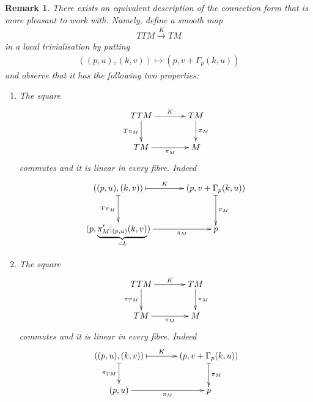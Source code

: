 \documentclass[11pt,a4paper,twoside,openany]{report}
\theoremstyle{my-theorem}
\theoremstyle{non-theorem}
\newtheorem{remark}[theorem]{Remark}
\begin{document}
			\begin{remark}
				There exists an equivalent description of the connection form that is more pleasant to work with. Namely, define a smooth map
				\begin{align*}
					TTM \xrightarrow{K} TM
				\end{align*}
				in a local trivialisation by putting
				\begin{align*}
					((p,u),(k,v)) \mapsto (p,v+\Gamma_p(k,u))
				\end{align*}
				and observe that it has the following two properties:
				\begin{enumerate}[label=\rm(\alph*)]
					\item The square
					\begin{align*}
						\xymatrixcolsep{3pc}\xymatrix{
							TTM \ar[d]_-{T\pi_{M}} \ar[r]^-{K} &
							TM \ar[d]^-{\pi_M}\\
							TM \ar[r]_-{\pi_M} & M}
					\end{align*}
					commutes and it is linear in every fibre. Indeed
					\begin{align*}
						\xymatrixcolsep{3pc}\xymatrix{
							((p,u),(k,v)) \ar@{|->}[d]_-{T\pi_{M}} \ar@{|->}[r]^-{K} &
							(p,v+\Gamma_p(k,u)) \ar@{|->}[d]^-{\pi_M}\\
							(p,\underbrace{\pi_M'|_{(p,u)}(k,v)}_{=k}) \ar[r]_-{\pi_M} & p}
					\end{align*}
				
					\item The square
					\begin{align*}
						\xymatrixcolsep{3pc}\xymatrix{
							TTM \ar[d]_-{\pi_{TM}} \ar[r]^-{K} &
							TM \ar[d]^-{\pi_M}\\
							TM \ar[r]_-{\pi_M} & M}
					\end{align*}
					commutes and it is linear in every fibre. Indeed
					\begin{align*}
						\xymatrixcolsep{3pc}\xymatrix{
							((p,u),(k,v)) \ar@{|->}[d]_-{\pi_{TM}} \ar@{|->}[r]^-{K} &
							(p,v+\Gamma_p(k,u)) \ar@{|->}[d]^-{\pi_M}\\
							(p,u) \ar[r]_-{\pi_M} & p}
					\end{align*}
				\end{enumerate}
			\end{remark}
		
\end{document}
